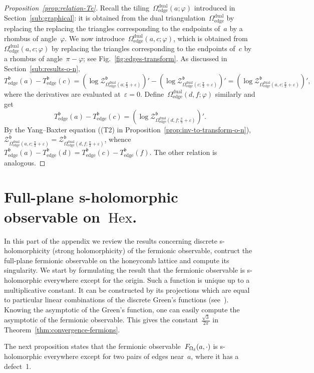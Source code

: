 \documentclass[reqno,11pt,a4paper]{amsart}
\theoremstyle{remark}
\newcommand{\Hex}{\mathrm{Hex}}
\newcommand{\Te}{T_{\mathrm{edge}}}       \newcommand{\Ce}{c_{\mathrm{edge}}}
\renewcommand{\b}{\mathfrak{b}}
\newcommand{\OmegaDual}{\Omega^{\mathrm{dual}}}
\newcommand{\OmegaE}{\OmegaDual_{\mathrm{edge}}}
\def\cZ{\mathcal Z}
\begin{document}
\begin{proof}[Proposition~\ref{prop:relation-Te}]
	Recall the tiling~$\OmegaE(a;\varphi)$ introduced in Section~\ref{sub:graphical}: it is obtained from the dual triangulation~$\OmegaE$ by replacing the replacing the triangles corresponding to the endpoints of~$a$ by a rhombus of angle~$\varphi$.
	We now introduce~$\OmegaE(a,c;\varphi)$, which is obtained from~$\OmegaE(a,c;\varphi)$ by replacing the triangles corresponding to the endpoints of~$c$ by a rhombus of angle~$\pi-\varphi$; see Fig.~\ref{fig:edges-transform}.
	As discussed in Section~\ref{sub:results-o-n},
	\[
		\Te^\b(a)-\Te^\b(c) = (\log \cZ_{\OmegaE(a;\tfrac\pi{3}+\varepsilon)}^{\b})'-(\log \cZ_{\OmegaE(c;\tfrac\pi{3}+\varepsilon)}^{\b})'=(\log \cZ_{\OmegaE(a,c;\tfrac\pi{3}+\varepsilon)}^{\b})',
	\]
	where the derivatives are evaluated at~$\varepsilon=0$. Define~$\OmegaE(d,f;\varphi)$ similarly and get
	\[
		\Te^\b(a)-\Te^\b(c) =(\log \cZ_{\OmegaE(d,f;\tfrac\pi{3}+\varepsilon)}^{\b})'.
	\]
	By the Yang--Baxter equation ((T2) in Proposition~\ref{prop:inv-to-transform-o-n}), $\cZ_{\OmegaE(a,c;\tfrac\pi{3}+\varepsilon)}^{\b} = \cZ_{\OmegaE(d,f;\tfrac\pi{3}+\varepsilon)}^{\b}$, whence~$\Te^\b(a)-\Te^\b(d) = \Te^\b(c)-\Te^\b(f)$.
	The other relation is analogous.
\end{proof}

\appendix

\section{Full-plane s-holomorphic observable on~$\Hex$.}
In this part of the appendix we review the results concerning discrete s-holomorphicity (strong holomorphicity)
of the fermionic observable, contruct the full-plane fermionic observable on the honeycomb lattice
and compute its singularity.
We start by formulating the result that the fermionic observable is s-holomorphic everywhere
except for the origin.
Such a function is unique up to a multiplicative constant.
It can be constructed by its projections which are equal to particular linear combinations
of the discrete Green's functions (see~\cite{KenWil15}).
Knowing the asymptotic of the Green's function, one can easily compute the asymptotic of the
fermionic observable.
This gives the constant~$\tfrac{\sqrt{3}}{2\pi}$ in Theorem~\ref{thm:convergence-fermions}.

The next proposition states that the fermionic observable~$F_{\Omega_\delta}(a,\cdot)$ is s-holomorphic everywhere
except for two pairs of edges near~$a$, where it has a defect~1.
\end{document}
